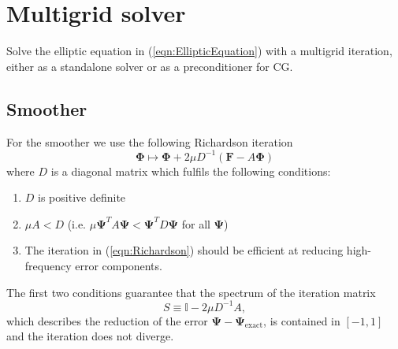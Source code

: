\documentclass[12pt]{article}
\renewcommand{\vec}[1]{\boldsymbol{#1}}
\begin{document}
\section{Multigrid solver}
Solve the elliptic equation in (\ref{eqn:EllipticEquation}) with a multigrid iteration, either as a standalone solver or as a preconditioner for CG.
\subsection{Smoother}
For the smoother we use the following Richardson iteration
\begin{equation}
  \vec{\Phi} \mapsto \vec{\Phi} + 2\mu D^{-1} \left(\vec{F}-A\vec{\Phi}\right)
  \label{eqn:Richardson}
\end{equation}
where $D$ is a diagonal matrix which fulfils the following conditions:
\begin{enumerate}
  \item $D$ is positive definite 
  \item $\mu A < D$ (i.e. $\mu \vec{\Psi}^T A \vec{\Psi} < \vec{\Psi}^T D \vec{\Psi}$ for all $\vec{\Psi}$)
  \item The iteration in (\ref{eqn:Richardson}) should be efficient at reducing high-frequency error components.
\end{enumerate}
The first two conditions guarantee that the spectrum of the iteration matrix 
\begin{equation}
  S \equiv \mathbb{I} - 2 \mu D^{-1} A,
\end{equation}
which describes the reduction of the error $\vec{\Psi}-\vec{\Psi}_{\operatorname{exact}}$, is contained in $[-1,1]$ and the iteration does not diverge.
\end{document}
